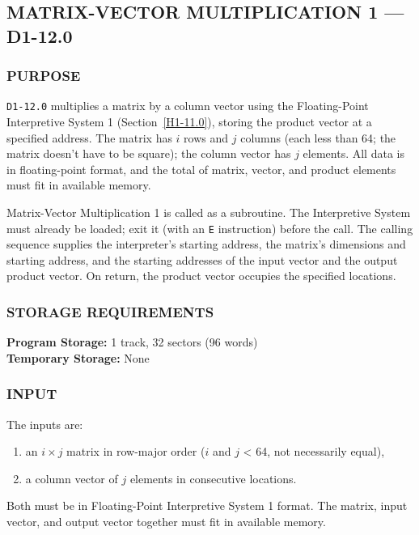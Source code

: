 \subsection*{MATRIX-VECTOR MULTIPLICATION 1 --- D1-12.0}
\label{subsec:matrix_vector_multiplication_1}

\subsubsection*{PURPOSE}
\texttt{D1-12.0} multiplies a matrix by a column vector using the Floating-Point Interpretive System 1 (Section~\ref{H1-11.0}), storing the product vector at a specified address. The matrix has $i$ rows and $j$ columns (each less than 64; the matrix doesn't have to be square); the column vector has $j$ elements. All data is in floating-point format, and the total of matrix, vector, and product elements must fit in available memory.

Matrix-Vector Multiplication 1 is called as a subroutine. The Interpretive System must already be loaded; exit it (with an \texttt{E} instruction) before the call. The calling sequence supplies the interpreter's starting address, the matrix's dimensions and starting address, and the starting addresses of the input vector and the output product vector. On return, the product vector occupies the specified locations.

\subsubsection*{STORAGE REQUIREMENTS}
\textbf{Program Storage:} 1 track, 32 sectors (96 words) \\
\textbf{Temporary Storage:} None

\subsubsection*{INPUT}
The inputs are:
\begin{enumerate}[label=\arabic*., leftmargin=1.5em, itemsep=2pt]
    \item an $i \times j$ matrix in row-major order ($i$ and $j$ < 64, not necessarily equal),
    \item a column vector of $j$ elements in consecutive locations.
\end{enumerate}
\noindent
Both must be in Floating-Point Interpretive System 1 format. The matrix, input vector, and output vector together must fit in available memory.

